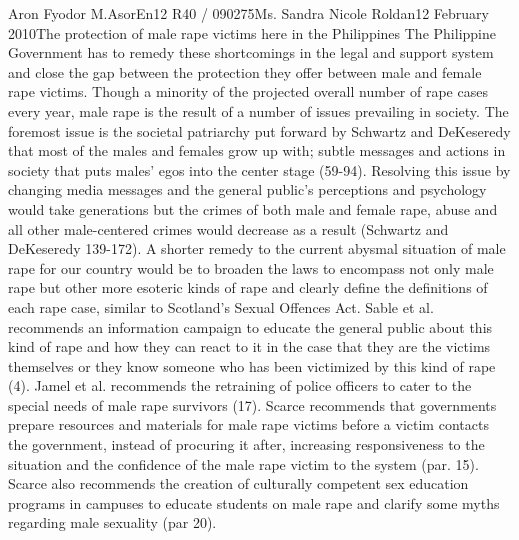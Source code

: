 \documentclass[12pt,letterpaper]{article}
\begin{document}
\begin{mla}{Aron Fyodor M.}{Asor}{En12 R40 / 090275}{Ms. Sandra Nicole Roldan}{12 February 2010}{The protection of male rape victims here in the Philippines}
\tab The Philippine Government has to remedy these shortcomings in the legal and support system and close the gap between the protection they offer between male and female rape victims. Though a minority of the projected overall number of rape cases every year, male rape is the result of a number of issues prevailing in society. The foremost issue is the societal patriarchy put forward by Schwartz and DeKeseredy that most of the males and females grow up with; subtle messages and actions in society that puts males' egos into the center stage (59-94). Resolving this issue by changing media messages and the general public's perceptions and psychology would take generations but the crimes of both male and female rape, abuse and all other male-centered crimes would decrease as a result (Schwartz and DeKeseredy 139-172). A shorter remedy to the current abysmal situation of male rape for our country would be to broaden the laws to encompass not only male rape but other more esoteric kinds of rape and clearly define the definitions of each rape case, similar to Scotland's Sexual Offences Act. Sable et al. recommends an information campaign to educate the general public about this kind of rape and how they can react to it in the case that they are the victims themselves or they know someone who has been victimized by this kind of rape (4). Jamel et al. recommends the retraining of police officers to cater to the special needs of male rape survivors (17). Scarce recommends that governments prepare resources and materials for male rape victims before a victim contacts the government, instead of procuring it after, increasing responsiveness to the situation and the confidence of the male rape victim to the system (par. 15). Scarce also recommends the creation of culturally competent sex education programs in campuses to educate students on male rape and clarify some myths regarding male sexuality (par 20).









\end{mla}
\end{document}
